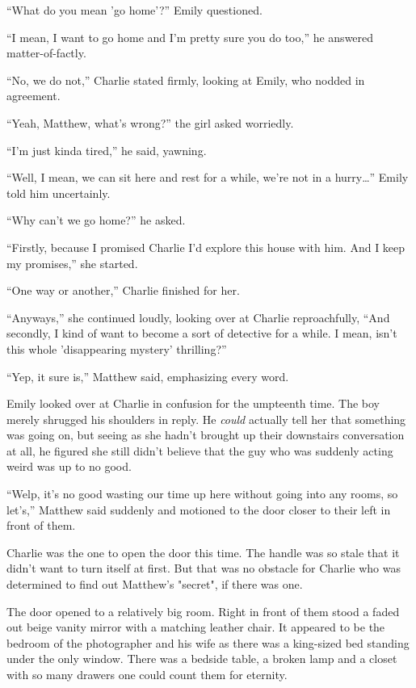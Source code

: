 “What do you mean 'go home'?” Emily questioned.

“I mean, I want to go home and I'm pretty sure you do too,” he answered matter-of-factly.

“No, we do not,” Charlie stated firmly, looking at Emily, who nodded in agreement.

“Yeah, Matthew, what's wrong?” the girl asked worriedly.

“I'm just kinda tired,” he said, yawning.

“Well, I mean, we can sit here and rest for a while, we're not in a hurry…” Emily told him uncertainly.

“Why can't we go home?” he asked.

“Firstly, because I promised Charlie I'd explore this house with him. And I keep my promises,” she started.

“One way or another,” Charlie finished for her.

“Anyways,” she continued loudly, looking over at Charlie reproachfully, “And secondly, I kind of want to become a sort of detective for a while. I mean, isn't this whole 'disappearing mystery' thrilling?”

“Yep, it sure is,” Matthew said, emphasizing every word.

Emily looked over at Charlie in confusion for the umpteenth time. The boy merely shrugged his shoulders in reply. He \textit{could} actually tell her that something was going on, but seeing as she hadn't brought up their downstairs conversation at all, he figured she still didn't believe that the guy who was suddenly acting weird was up to no good.

“Welp, it's no good wasting our time up here without going into any rooms, so let's,” Matthew said suddenly and motioned to the door closer to their left in front of them.

Charlie was the one to open the door this time. The handle was so stale that it didn't want to turn itself at first. But that was no obstacle for Charlie who was determined to find out Matthew's "secret", if there was one.

The door opened to a relatively big room. Right in front of them stood a faded out beige vanity mirror with a matching leather chair. It appeared to be the bedroom of the photographer and his wife as there was a king-sized bed standing under the only window. There was a bedside table, a broken lamp and a closet with so many drawers one could count them for eternity.

